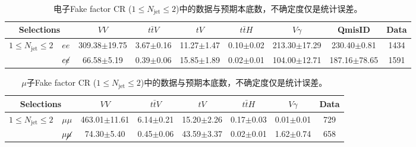 \begin{table}[!ht]
\begin{center}
\scriptsize
\begin{tabular}{c|c|cccc|c|c|c}
\hline
\hline
\multicolumn{2}{c|}{ Selections}                      &$VV$  &$t\bar{t}V$    &$tV$    &$t\bar{t}H$     &$V\gamma$  &QmisID  &Data \\
\hline
\multirow{2}{*}{$1\leq N_{\text{jet}} \leq 2$}  &$ee$ &309.38$\pm$19.75    &3.67$\pm$0.16    &11.27$\pm$1.47    &0.10$\pm$0.02    &213.30$\pm$17.29    &230.40$\pm$0.81    &1434 \\
\cline{2-9}                                       &$e\cancel{e}$ &66.58$\pm$5.19    &0.39$\pm$0.06    &15.85$\pm$1.89    &0.02$\pm$0.01    &104.00$\pm$12.71    &187.16$\pm$78.65    &1591 \\
\hline
\hline
\end{tabular}
\caption{电子Fake factor CR ($1\leq N_{\text{jet}} \leq 2$)中的数据与预期本底数，不确定度仅是统计误差。}
\end{center}
\end{table}

\begin{table}[!ht]
\centering
\scriptsize
\begin{tabular}{c|c|cccc|c|c}
\hline
\hline
\multicolumn{2}{c|}{ Selections}                           &$VV$  &$t\bar{t}V$    &$tV$    &$t\bar{t}H$     &$V\gamma$    &Data \\
\hline
\multirow{2}{*}{$1\leq N_{\text{jet}} \leq 2$}   &$\mu\mu$ &463.01$\pm$11.61    &6.14$\pm$0.21    &15.20$\pm$2.26    &0.17$\pm$0.03    &0.01$\pm$0.01    &729 \\
\cline{2-8}
                                        &$\mu\cancel{\mu}$ &74.30$\pm$5.40    &0.45$\pm$0.06    &43.59$\pm$3.37    &0.02$\pm$0.01    &1.62$\pm$0.74    &658 \\
\hline
\hline
\end{tabular}
\caption{$\mu$子Fake factor CR ($1\leq N_{\text{jet}} \leq 2$)中的数据与预期本底数，不确定度仅是统计误差。}
\label{tab:ff_mu_CR_2jets}
\end{table}
